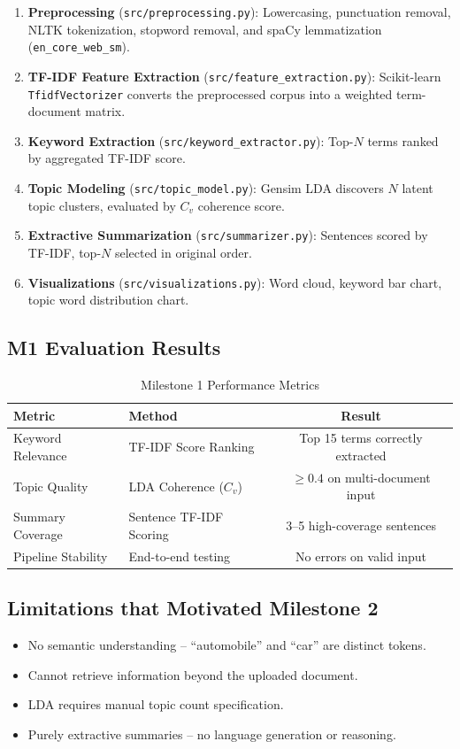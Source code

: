 \documentclass[12pt, a4paper]{article}
\begin{document}
\begin{enumerate}
  \item \textbf{Preprocessing} (\texttt{src/preprocessing.py}): Lowercasing, punctuation removal, NLTK tokenization, stopword removal, and spaCy lemmatization (\texttt{en\_core\_web\_sm}).
  \item \textbf{TF-IDF Feature Extraction} (\texttt{src/feature\_extraction.py}): Scikit-learn \texttt{TfidfVectorizer} converts the preprocessed corpus into a weighted term-document matrix.
  \item \textbf{Keyword Extraction} (\texttt{src/keyword\_extractor.py}): Top-$N$ terms ranked by aggregated TF-IDF score.
  \item \textbf{Topic Modeling} (\texttt{src/topic\_model.py}): Gensim LDA discovers $N$ latent topic clusters, evaluated by $C_v$ coherence score.
  \item \textbf{Extractive Summarization} (\texttt{src/summarizer.py}): Sentences scored by TF-IDF, top-$N$ selected in original order.
  \item \textbf{Visualizations} (\texttt{src/visualizations.py}): Word cloud, keyword bar chart, topic word distribution chart.
\end{enumerate}

\subsection{M1 Evaluation Results}
\begin{table}[H]
\centering
\caption{Milestone 1 Performance Metrics}
\begin{tabular}{@{}llc@{}}
\toprule
\textbf{Metric} & \textbf{Method} & \textbf{Result} \\
\midrule
Keyword Relevance  & TF-IDF Score Ranking    & Top 15 terms correctly extracted \\
Topic Quality      & LDA Coherence ($C_v$)  & $\geq 0.4$ on multi-document input \\
Summary Coverage   & Sentence TF-IDF Scoring & 3--5 high-coverage sentences \\
Pipeline Stability & End-to-end testing      & No errors on valid input \\
\bottomrule
\end{tabular}
\end{table}

\subsection{Limitations that Motivated Milestone 2}
\begin{itemize}
  \item No semantic understanding -- ``automobile'' and ``car'' are distinct tokens.
  \item Cannot retrieve information beyond the uploaded document.
  \item LDA requires manual topic count specification.
  \item Purely extractive summaries -- no language generation or reasoning.
\end{itemize}
\end{document}
